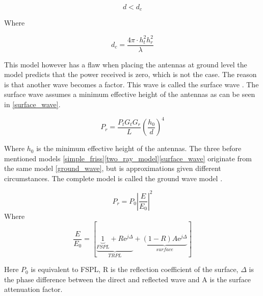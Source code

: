 


\begin{equation}
d < d_{c}
\label{two_ray_cond}
\end{equation}

Where %

\begin{equation}
d_{c} = \frac{4\pi \cdot h^2_t h^2_r }{\lambda}
\label{two_ray_cross_dis}
\end{equation}  

This model however has a flaw when placing the antennas at ground level the model predicts that the power received is zero, which is not the case. The reason is that another wave becomes a factor. This wave is called the surface wave \cite{Chong}. The surface wave assumes a minimum effective height of the antennas as can be seen in \eqref{surface_wave}. 

\begin{equation}
P_r=\frac{P_t G_t G_r }{L}\left(\frac{h_0}{d}\right)^4
\label{surface_wave}
\end{equation}

Where $h_0$ is the minimum effective height of the antennas. 
The three before mentioned models \eqref{simple_friss}\eqref{two_ray_model}\eqref{surface_wave} originate from the same model \eqref{ground_wave}, but is approximations given different circumstances. The complete model is called the ground wave model \cite{Chong,Bullington}. 


\begin{equation}
P_r=P_0 \left|\frac{E}{E_0}\right|^2 
\label{ground_wave}
\end{equation}
Where
\begin{equation}
\frac{E}{E_{0}}=[\underbrace{\underbrace{1}_{FSPL}+R\text{e}^{j\Delta}}_{TRPL}+\underbrace{(1-R)A\text{e}^{j\Delta}}_{surface}]
\label{ground_wave_EE0}
\end{equation}

Here $P_{0}$ is equivalent to FSPL, R is the reflection coefficient of the surface, $\Delta$ is the phase difference between the direct and reflected wave and A is the surface attenuation factor.

